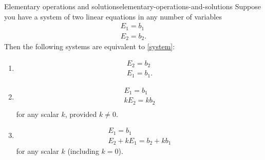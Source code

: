 \begin{theorem}{Elementary operations and solutions}{elementary-operations-and-solutions}
Suppose you have a system of two linear equations in any number of variables
\begin{equation}
 \begin{array}{c}
  E_{1}=b_{1}\\
  E_{2}=b_{2}.
\end{array} \label{system}
\end{equation}
Then the following systems are equivalent to \eqref{system}:
\begin{enumerate}
\item   \begin{equation}
	\begin{array}{c}
	E_{2}=b_{2}\\
	E_{1}=b_{1}.
	\end{array}
	\label{thm-1.9.1}
	\end{equation}
\item  \begin{equation}
	\begin{array}{c}
	E_{1}=b_{1} \\
	kE_{2}=kb_{2}\\
	\end{array}
	\label{thm-1.9.2}
	\end{equation}
  for any scalar $k$, provided $k\neq0$.
\item \begin{equation}
      \begin{array}{c}
       E_{1}=b_{1} \\
       E_{2}+kE_{1}=b_{2}+kb_{1}
       \end{array}
	\label{thm-1.9.3}
	\end{equation}
	for any scalar $k$ (including $k=0$).

\end{enumerate}
\end{theorem}

